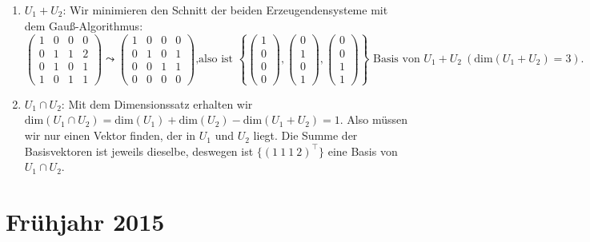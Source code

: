 \begin{enumerate}
	 \item \( U_1 + U_2 \): Wir minimieren den Schnitt der beiden Erzeugendensysteme mit dem Gauß-Algorithmus:
	 \begin{equation*}
	 	\begin{pmatrix}
	 		1 & 0 & 0 & 0 \\
	 		0 & 1 & 1 & 2 \\
	 		0 & 1 & 0 & 1 \\
	 		1 & 0 & 1 & 1
	 	\end{pmatrix} \leadsto \begin{pmatrix}
	 		1 & 0 & 0 & 0 \\
	 		0 & 1 & 0 & 1 \\
	 		0 & 0 & 1 & 1 \\
	 		0 & 0 & 0 & 0
	 	\end{pmatrix}\text{,also ist } \left\{ \begin{pmatrix}
	 	1 \\ 0 \\ 0 \\ 0
	 \end{pmatrix}, \begin{pmatrix}
	 	0 \\ 1 \\ 0 \\ 1
	 \end{pmatrix}, \begin{pmatrix}
	 	0 \\ 0 \\ 1 \\ 1
	 \end{pmatrix} \right\}\text{ Basis von } U_1 + U_2 \ (\text{dim}(U_1 + U_2) = 3)\text{.}
	 \end{equation*}

	 \item \( U_1 \cap U_2 \): Mit dem Dimensionssatz erhalten wir \( \text{dim}(U_1 \cap U_2) = \text{dim}(U_1) + \text{dim}(U_2) - \text{dim}(U_1 + U_2) = 1 \). Also müssen wir nur einen Vektor finden, der in \( U_1 \) und \( U_2 \) liegt. Die Summe der Basisvektoren ist jeweils dieselbe, deswegen ist \( \{ (1 \ 1 \ 1 \ 2)^\top \} \) eine Basis von \( U_1 \cap U_2 \).
\end{enumerate}

\newpage


\section{Frühjahr 2015}


